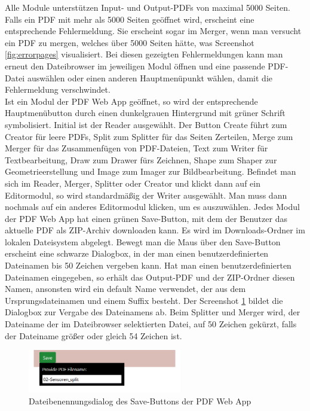 Alle Module unterstützen Input- und Output-PDFs von maximal 5000 Seiten. Falls ein PDF mit mehr als 5000 Seiten geöffnet wird, erscheint eine entsprechende Fehlermeldung. Sie erscheint sogar im Merger, wenn man versucht ein PDF zu mergen, welches über 5000 Seiten hätte, was Screenshot \ref{fig:errorpages} visualisiert. Bei diesen gezeigten Fehlermeldungen kann man erneut den Dateibrowser im jeweiligen Modul öffnen und eine passende PDF-Datei auswählen oder einen anderen Hauptmenüpunkt wählen, damit die Fehlermeldung verschwindet. \\
Ist ein Modul der PDF Web App geöffnet, so wird der entsprechende Hauptmenübutton durch einen dunkelgrauen Hintergrund mit grüner Schrift symbolisiert. Initial ist der Reader ausgewählt. Der Button Create führt zum Creator für leere PDFs, Split zum Splitter für das Seiten Zerteilen, Merge zum Merger für das Zusammenfügen von PDF-Dateien, Text zum Writer für Textbearbeitung, Draw zum Drawer fürs Zeichnen, Shape zum Shaper zur Geometrieerstellung und Image zum Imager zur Bildbearbeitung. Befindet man sich im Reader, Merger, Splitter oder Creator und klickt dann auf ein Editormodul, so wird standardmäßig der Writer ausgewählt. Man muss dann nochmals auf ein anderes Editormodul klicken, um es auszuwählen. Jedes Modul der PDF Web App hat einen grünen Save-Button, mit dem der Benutzer das aktuelle PDF als ZIP-Archiv downloaden kann. Es wird im Downloads-Ordner im lokalen Dateisystem abgelegt. Bewegt man die Maus über den Save-Button erscheint eine schwarze Dialogbox, in der man einen benutzerdefinierten Dateinamen bis 50 Zeichen vergeben kann. Hat man einen benutzerdefinierten Dateinamen eingegeben, so erhält das Output-PDF und der ZIP-Ordner diesen Namen, ansonsten wird ein default Name verwendet, der aus dem Ursprungsdateinamen und einem Suffix besteht. Der Screenshot \ref{fig:save} bildet die Dialogbox zur Vergabe des Dateinamens ab. Beim Splitter und Merger wird, der Dateiname der im Dateibrowser selektierten Datei, auf 50 Zeichen gekürzt, falls der Dateiname größer oder gleich 54 Zeichen ist.

\begin{figure}[!htbp]
	\centering
	\includegraphics[width=0.6\textwidth]{"images/save.png"}
	\caption{Dateibenennungsdialog des Save-Buttons der PDF Web App}
	\label{fig:save}
\end{figure}

